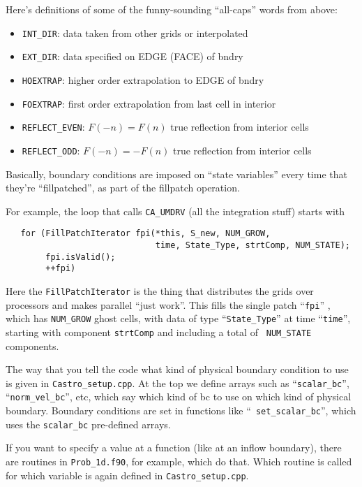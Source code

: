 Here's definitions of some of the funny-sounding ``all-caps''
words from above:
\begin{itemize}
\item {\tt INT\_DIR}: data taken from other grids or interpolated

\item {\tt EXT\_DIR}: data specified on EDGE (FACE) of bndry

\item {\tt HOEXTRAP}: higher order extrapolation to EDGE of bndry

\item {\tt FOEXTRAP}: first order extrapolation from last cell in interior

\item {\tt REFLECT\_EVEN}: $F(-n) = F(n)$ true reflection from interior cells

\item {\tt REFLECT\_ODD}: $F(-n) = -F(n)$ true reflection from interior cells
\end{itemize}

Basically, boundary conditions are imposed on ``state variables'' every
time that they're ``fillpatched'', as part of the fillpatch operation.

For example, the loop that calls {\tt CA\_UMDRV} (all the integration stuff) starts with
\begin{lstlisting}
   for (FillPatchIterator fpi(*this, S_new, NUM_GROW,
                              time, State_Type, strtComp, NUM_STATE);
        fpi.isValid();
        ++fpi)
\end{lstlisting}
Here the {\tt FillPatchIterator} is the thing that distributes the
grids over processors and makes parallel ``just work''. This fills the
single patch ``{\tt fpi}'' , which has {\tt NUM\_GROW} ghost cells,
with data of type ``{\tt State\_Type}'' at time ``{\tt time}'',
starting with component {\tt strtComp} and including a total of {\tt
  NUM\_STATE} components.

The way that you tell the code what kind of physical boundary
condition to use is given in {\tt Castro\_setup.cpp}. At the top we
define arrays such as ``{\tt scalar\_bc}'', ``{\tt norm\_vel\_bc}'',
etc, which say which kind of bc to use on which kind of physical
boundary.  Boundary conditions are set in functions like ``{\tt
  set\_scalar\_bc}'', which uses the {\tt scalar\_bc} pre-defined
arrays.

If you want to specify a value at a function (like at an inflow
boundary), there are routines in {\tt Prob\_1d.f90}, for example, which do
that. Which routine is called for which variable is again defined in
{\tt Castro\_setup.cpp}.


